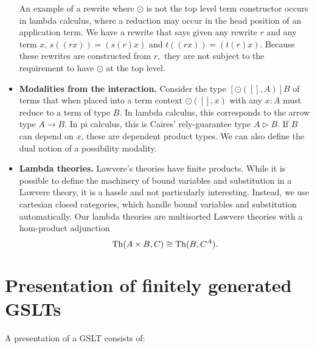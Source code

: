 \documentclass{article}
\begin{document}
\begin{itemize}
An example of a rewrite where $\odot$ is not the top level term constructor occurs in lambda calculus, where a reduction may occur in the head position of an application term.  We have a rewrite that says given any rewrite $r$ and any term $x$, $s((r x)) = (s(r) x)$ and $t((r x)) = (t(r) x).$  Because these rewrites are constructed from $r,$ they are not subject to the requirement to have $\odot$ at the top level.

    \item {\bf Modalities from the interaction.}  Consider the type $[\odot([], A)] B$ of terms that when placed into a term context $\odot([], x)$ with any $x\colon A$ must reduce to a term of type $B$. In lambda calculus, this corresponds to the arrow type $A \to B$. In pi calculus, this is Caires' rely-guarantee type $A \triangleright B$.
If $B$ can depend on $x$, these are dependent product types.  We can also define the dual notion of a possibility modality.

    \item {\bf Lambda theories.}  Lawvere's theories have finite products. While it is possible to define the machinery of bound variables and substitution in a Lawvere theory, it is a hassle and not particularly interesting. Instead, we use cartesian closed categories, which handle bound variables and substitution automatically.  Our lambda theories are multisorted Lawvere theories with a hom-product adjunction
$${\rm Th}(A \times B, C) \cong {\rm Th}(B, C^A).$$

\end{itemize}

\section{Presentation of finitely generated GSLTs}

A presentation of a GSLT consists of:
\end{document}
